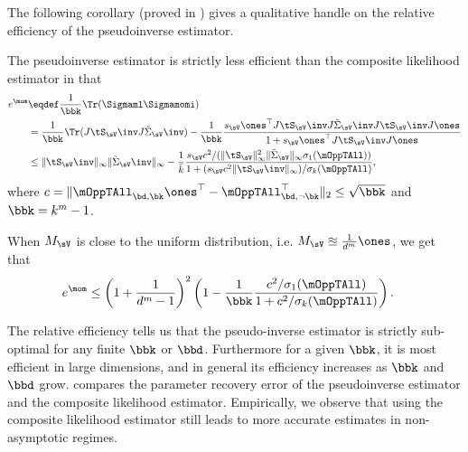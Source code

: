The following corollary (proved in ) gives
a qualitative handle on the relative efficiency of the pseudoinverse
estimator.
\begin{corollary}
  \label{cor:efficiency}
The pseudoinverse estimator is strictly less efficient
than the composite likelihood estimator in that 
\begin{align*}
e^\mom &\eqdef 
    \frac{1}{\bbk} \Tr(\Sigmaml\Sigmamomi ) \\
        &= \frac{1}{\bbk} \Tr( J \tS_\sV\inv J \tilde\Sigma_\sV\inv ) - \frac{1}{\bbk} \frac{s_\sV \ones^\top J \tS_\sV\inv J \tilde\Sigma_\sV\inv J \tS_\sV\inv J \ones }
      {1 + s_\sV \ones^\top J \tS_\sV\inv J \ones} \\
    &\le \|\tS_\sV\inv\|_\infty  \|\tilde\Sigma_\sV\inv\|_\infty
      - 
        \frac{1}{\bar k} 
    \frac{
        s_\sV c^2 /(\|\tS_\sV\|^2_{\infty} \|\tilde\Sigma_\sV\|_{\infty}
            \sigma_{1}(\mOppTAll))
    }
    {1 + (s_\sV c^2 \|\tS_\sV\inv\|_{\infty})/
          \sigma_{k}(\mOppTAll)
    },
\end{align*}
where $c = \|\mOppTAll_{\bd,\bk} \ones^\top - \mOppTAll_{\bd,\neg \bk}^\top\|_2 \le \sqrt{\bbk}$ and $\bbk = k^m - 1$.

When $M_\sV$ is close to the uniform distribution, i.e. $M_\sV \approxeq \frac{1}{d^m} \ones$, we get that 
\begin{align*}
e^\mom 
    &\le
    \left(1 + \frac{1}{d^m - 1}\right)^2 
    \left(1 - \frac{1}{\bbk} \frac{c^2/\sigma_{1}(\mOppTAll)}{1 + c^2 / \sigma_{k}(\mOppTAll)}\right).
\end{align*}
\end{corollary}

The relative efficiency tells us that the pseudo-inverse estimator is
strictly sub-optimal for any finite $\bbk$ or $\bbd$. Furthermore for
a given $\bbk$, it is most efficient in large dimensions, and in general
its efficiency increases as $\bbk$ and $\bbd$ grow.
 compares the parameter recovery error of the
  pseudoinverse estimator and the composite likelihood estimator.
Empirically, we observe that using the composite likelihood estimator
still leads to more accurate estimates in non-asymptotic regimes.


